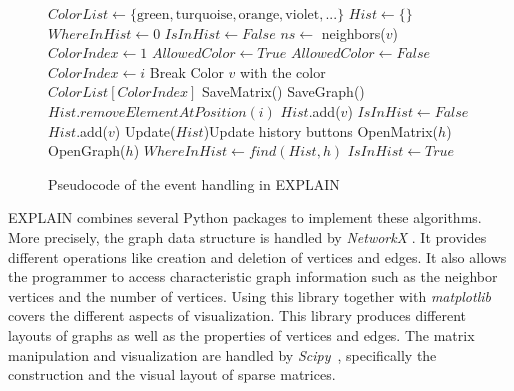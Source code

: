 \documentclass[12pt, twoside,a4paper,toc=bibliography]{scrbook}
\begin{document}
\begin{figure}
\centering
\begin{algorithmic}[1]
\State $ColorList \gets \{\text{green}, \text{turquoise}, \text{orange}, \text{violet}, ...\}$
\State $Hist \gets \{\}$
\State $WhereInHist \gets 0$
\State $IsInHist \gets False$
\State
{}
\State $ns\gets$ neighbors($v$)
\State $ColorIndex \gets 1$
\State $AllowedColor \gets True$
\State $AllowedColor \gets False$
\EndIf
\EndFor
{}
\State $ColorIndex \gets i$
\State Break
\EndIf
\EndFor
\State Color $v$ with the color $ColorList[ColorIndex]$
\State
{}
\State SaveMatrix()
\State SaveGraph()
\EndIf
{}
\State $Hist.removeElementAtPosition(i)$
\EndFor
\State $Hist$.add($v$)
\State $IsInHist \gets False$
\Else
\State $Hist$.add($v$)
\EndIf
\State Update($Hist$)\Comment Update history buttons
\EndProcedure
\State
\State
{}
\State OpenMatrix($h$)
\State OpenGraph($h$)
\State $WhereInHist \gets find(Hist,h)$
\State $IsInHist \gets True$
\EndProcedure
\end{algorithmic}
\caption{Pseudocode of the event handling in EXPLAIN}
\label{f:alg}
\end{figure}

\mbox{EXPLAIN} combines several Python packages to implement these algorithms. More precisely, the graph data structure is handled by \textit{NetworkX} \cite{networkx2008}. It provides different operations like creation and deletion of vertices and edges. It also allows the programmer to access characteristic graph information such as the neighbor vertices and the number of vertices. Using this library together with \textit{matplotlib} \cite{matplotlib2007} covers the different aspects of visualization. This library produces different layouts of graphs as well as the properties of vertices and edges. The matrix manipulation and visualization are handled by \textit{Scipy}~\cite{scipy2001}, specifically the construction and the visual layout of sparse matrices.
\end{document}
